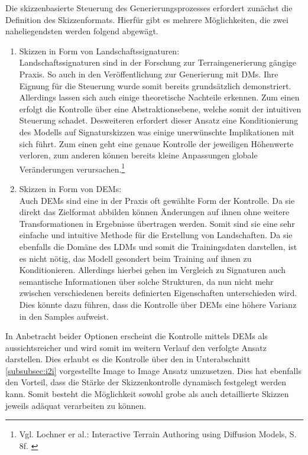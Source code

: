 Die skizzenbasierte Steuerung des Generierungsprozesses erfordert zunächst die Definition des Skizzenformats. Hierfür gibt es mehrere Möglichkeiten, die zwei naheliegendsten werden folgend abgewägt. 
\begin{enumerate}
    \item Skizzen in Form von Landschaftssignaturen: \\
    Landschaftssignaturen sind in der Forschung zur Terraingenerierung gängige Praxis. So auch in den Veröffentlichung zur Generierung mit \ac{DM}s. Ihre Eignung für die Steuerung wurde somit bereits grundsätzlich demonstriert. \\
    Allerdings lassen sich auch einige theoretische Nachteile erkennen. Zum einen erfolgt die Kontrolle über eine Abstraktionsebene, welche somit der intuitiven Steuerung schadet. Desweiteren erfordert dieser Ansatz eine Konditionierung des Modells auf Signaturskizzen was einige unerwünschte Implikationen mit sich führt. Zum einen geht eine genaue Kontrolle der jeweiligen Höhenwerte verloren, zum anderen können bereits kleine Anpassungen globale Veränderungen verursachen.\footnote{
        Vgl. Lochner er al.: Interactive Terrain Authoring using Diffusion Models, S. 8f. 
        \cite{lochner2023interactive}
    }
    \item Skizzen in Form von \ac{DEM}s: \\
    Auch \ac{DEM}s sind eine in der Praxis oft gewählte Form der Kontrolle. Da sie direkt das Zielformat abbilden können Änderungen auf ihnen ohne weitere Transformationen in Ergebnisse übertragen werden. Somit sind sie eine sehr einfache und intuitive Methode für die Erstellung von Landschaften. Da sie ebenfalls die Domäne des \ac{LDM}s und somit die Trainingsdaten darstellen, ist es nicht nötig, das Modell gesondert beim Training auf ihnen zu Konditionieren. Allerdings hierbei gehen im Vergleich zu Signaturen auch semantische Informationen über solche Strukturen, da nun nicht mehr zwischen verschiedenen bereits definierten Eigenschaften unterschieden wird. Dies könnte dazu führen, dass die Kontrolle über \ac{DEM}s eine höhere Varianz in den Samples aufweist.
\end{enumerate}

In Anbetracht beider Optionen erscheint die Kontrolle mittels \ac{DEM}s als aussichtsreicher und wird somit im weitern Verlauf den verfolgte Ansatz darstellen. Dies erlaubt es die Kontrolle über den in Unterabschnitt \ref{subsubsec:i2i} vorgestellte Image to Image Ansatz umzusetzen. Dies hat ebenfalls den Vorteil, dass die Stärke der Skizzenkontrolle dynamisch festgelegt werden kann. Somit besteht die Möglichkeit sowohl grobe als auch detaillierte Skizzen jeweils adäquat verarbeiten zu können. 

